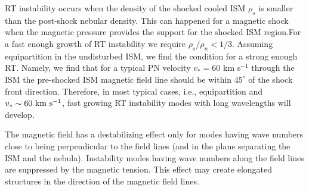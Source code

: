 RT instability occurs when the density of the shocked cooled ISM 
$\rho_s$ is smaller
than the post-shock nebular density. 
This can happened for a magnetic shock when the magnetic pressure
 provides the support for the shocked ISM region.For a fast enough growth of
RT instability we require $\rho_s/\rho_n < 1/3$.  
Assuming equipartition  in the 
undisturbed ISM, we find the condition for a strong enough RT.
Namely, we  find that for a typical PN velocity $v_\ast=60$  km s$^{-1}$
 through the ISM the pre-shocked ISM
magnetic field line should be within $45^\circ$ of the shock front direction.
 Therefore, in most typical cases, i.e., equipartition and
$v_\ast \sim 60 ~\rm{km} ~\rm{s}^{-1}$, fast growing RT instability modes with long
wavelengths will develop.

The magnetic field has a destabilizing effect only for modes
having wave numbers close to being perpendicular to the field lines
(and in the plane separating the ISM and the nebula).
Instability modes having wave numbers along the field lines are
suppressed by the magnetic tension. 
This effect may create elongated structures in the direction of the
magnetic field lines.

